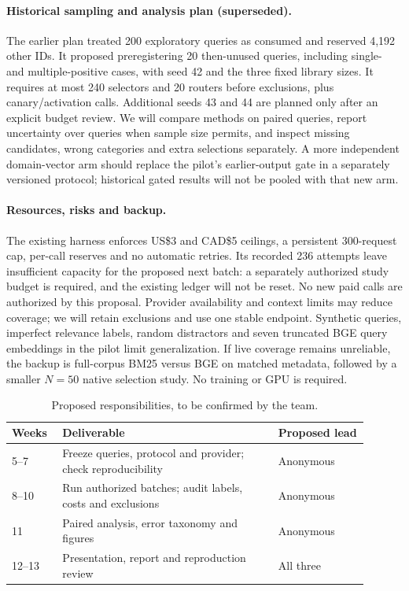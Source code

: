 \documentclass{article}
\begin{document}
\paragraph{Historical sampling and analysis plan (superseded).}
The earlier plan treated 200 exploratory queries as consumed and reserved 4,192
other IDs. It proposed preregistering 20 then-unused queries, including
single- and multiple-positive cases, with seed 42 and the three fixed library
sizes. It requires at most 240 selectors and 20 routers before exclusions, plus
canary/activation calls. Additional seeds 43 and 44 are planned only after an
explicit budget review. We will compare methods on paired queries, report
uncertainty over queries when sample size permits, and inspect missing candidates,
wrong categories and extra selections separately. A more independent domain-vector
arm should replace the pilot's earlier-output gate in a separately versioned
protocol; historical gated results will not be pooled with that new arm.

\paragraph{Resources, risks and backup.}
The existing harness enforces US\$3 and CAD\$5 ceilings, a persistent 300-request
cap, per-call reserves and no automatic retries. Its recorded 236 attempts leave
insufficient capacity for the proposed next batch: a separately authorized study
budget is required, and the existing ledger will not be reset. No new paid calls
are authorized by this proposal. Provider availability and context limits may
reduce coverage; we will retain exclusions and use one stable endpoint. Synthetic
queries, imperfect relevance labels, random distractors and seven truncated BGE
query embeddings in the pilot limit generalization. If live coverage remains
unreliable, the backup is full-corpus BM25 versus BGE on matched metadata, followed
by a smaller $N=50$ native selection study. No training or GPU is required.

\begin{table}[h]
\centering
\small
\begin{tabular}{p{0.12\linewidth}p{0.55\linewidth}p{0.23\linewidth}}
\toprule
Weeks & Deliverable & Proposed lead \\
\midrule
5--7 & Freeze queries, protocol and provider; check reproducibility & Anonymous \\
8--10 & Run authorized batches; audit labels, costs and exclusions & Anonymous \\
11 & Paired analysis, error taxonomy and figures & Anonymous \\
12--13 & Presentation, report and reproduction review & All three \\
\bottomrule
\end{tabular}
\caption{Proposed responsibilities, to be confirmed by the team.}
\label{tab:timeline}
\end{table}
\end{document}
